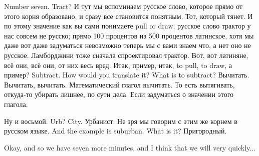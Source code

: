 \documentclass[main.tex]{subfiles}
\begin{document}
Number seven. Tract?
И тут мы вспоминаем русское слово, которое прямо от этого корня образовано, и сразу все становится понятным.
Тот, который тянет.
И по этому значение как вы сами понимаете pull or draw; русское слово трактор у нас совсем не русско; прямо 100 процентов на 500 процентов латинское, хотя мы даже вот даже задуматься невозможно теперь мы с вами знаем что, а нет оно не русское.
Ламборджини тоже сначала спроектировал трактор.
Вот, вот латиняне, всё они, всё они, от них весь вред.
Итак, пример, итак, to pull, to draw, а пример? Subtract.
How would you translate it? What is to subtract? Вычитать.
Вычитать, вычитать.
Математический глагол вычитать.
То есть вытягивать, откуда-то убирать лишнее, по сути дела.
Если задуматься о значении этого глагола.

Ну и восьмой. Urb?
City. Урбанист.
Не зря мы говорим с этим же корнем в русском языке.
And the example is suburban.
What is it? Пригородный.

Okay, and so we have seven more minutes, and I think that we will very quickly...
\end{document}
